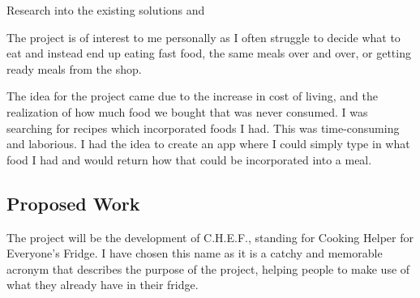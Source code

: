 \documentclass[../CHEFCookingHelperForEveryonesFridge.tex]{subfiles}
\renewcommand{\cite}[1]{\parencite{#1}}
\newcommand{\chef}{C.H.E.F.}
\begin{document}
Research into the existing solutions \cite{myfridgefood_myfridgefood_nodate} and \cite{supercook_supercook_nodate}

The project is of interest to me personally as I often struggle to decide what to eat and instead end up eating fast food,
the same meals over and over, or getting ready meals from the shop.

The idea for the project came due to the increase in cost of living, and the realization of how much food we bought that was
never consumed. I was searching for recipes which incorporated foods I had. This was time-consuming and laborious.
I had the idea to create an app where I could simply type in what food I had and would return how that could be incorporated
into a meal.



\subsection{Proposed Work}
The project will be the development of \chef{}, standing for Cooking Helper for Everyone's Fridge. I have chosen this name
as it is a catchy and memorable acronym that describes the purpose of the project, helping people to make use of
what they already have in their fridge.
\end{document}
